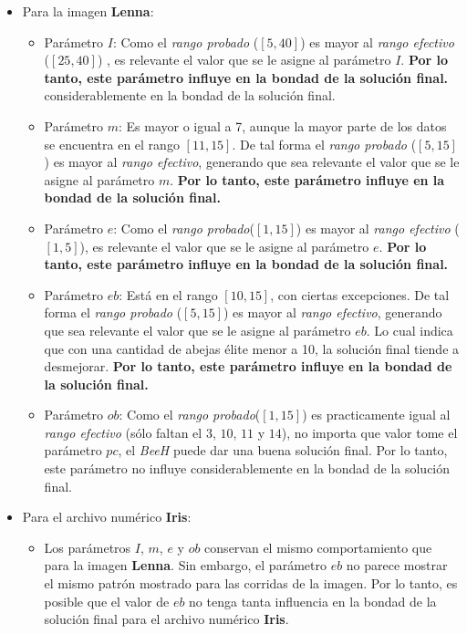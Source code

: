 \begin{itemize}
        \item Para la imagen {\bf Lenna}:
	        \begin{itemize}
		        \item Parámetro $I$:
		            Como el \emph{rango probado} ($[5, 40]$) es
		            mayor al \emph{rango efectivo} ($[25, 40]$) , es relevante el valor que se
		            le asigne al parámetro $I$. \textbf{Por lo tanto, este
		            parámetro influye en la bondad de la solución final.}
		            considerablemente en la bondad de la solución final.
		        \item Parámetro $m$:
		        	Es mayor o igual a 7,
					aunque la mayor parte de los datos se encuentra en el rango $[11, 15]$.
					De tal forma el \emph{rango probado} ($[5, 15]$) es
		            mayor al \emph{rango efectivo}, generando que sea relevante el valor que se
		            le asigne al parámetro $m$. \textbf{Por lo tanto, este
		            parámetro influye en la bondad de la solución final.}
		        \item Parámetro $e$:
		            Como el \emph{rango probado}($[1,15]$) es
		            mayor al \emph{rango efectivo} ($[1,5]$), es relevante el valor que se
		            le asigne al parámetro $e$. \textbf{Por lo tanto, este
		            parámetro influye en la bondad de la solución final.}
		        \item Parámetro $eb$:
					Está en el rango $[10, 15]$, con ciertas excepciones.
					De tal forma el \emph{rango probado} ($[5, 15]$) es
		            mayor al \emph{rango efectivo}, generando que sea relevante el valor que se
		            le asigne al parámetro $eb$. Lo cual indica que con
					una cantidad de abejas élite menor a 10, la solución final tiende a desmejorar.
					\textbf{Por lo tanto, este parámetro influye en la bondad de la solución final.} 
		        \item Parámetro $ob$:
		            Como el \emph{rango probado}($[1,15]$) es
		            practicamente igual al \emph{rango efectivo} (sólo faltan el $3$, $10$, $11$ y $14$), 
		            no importa que valor tome el
		            parámetro $pc$, el \emph{BeeH} puede dar una buena solución
		            final. Por lo tanto, este parámetro no influye
		            considerablemente en la bondad de la solución final.
            \end{itemize}
        \item Para el archivo numérico {\bf Iris}:
		    \begin{itemize}
		        \item Los parámetros $I$, $m$, $e$ y $ob$ conservan el mismo comportamiento
					  que para la imagen \textbf{Lenna}. Sin embargo, el parámetro $eb$ no parece
					  mostrar el mismo patrón mostrado para las corridas de la imagen. Por lo tanto,
				  	  es posible que el valor de $eb$ no tenga tanta influencia en la bondad de la
					  solución final para el archivo numérico \textbf{Iris}.
		    \end{itemize}
\end{itemize}

